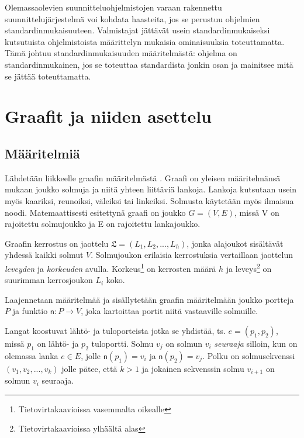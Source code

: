 \documentclass[finnish,12pt]{article}
\begin{document}
Olemassaolevien suunnitteluohjelmistojen varaan rakennettu suunnittelujärjestelmä voi kohdata haasteita, jos se perustuu ohjelmien standardinmukaisuuteen.
Valmistajat jättävät usein standardinmukaiseksi kutsutuista ohjelmistoista määrittelyn mukaisia ominaisuuksia toteuttamatta.\cite{RefWorks:42}
Tämä johtuu standardinmukaisuuden määritelmästä: ohjelma on standardinmukainen, jos se toteuttaa standardista jonkin osan ja mainitsee mitä se jättää toteuttamatta. 

	\clearpage

	
	\section{Graafit ja niiden asettelu}

	\subsection{Määritelmiä}

Lähdetään liikkeelle graafin määritelmästä \cite{RefWorks:39}.
Graafi on yleisen määritelmänsä mukaan joukko solmuja ja niitä yhteen liittäviä lankoja.
Lankoja kutsutaan usein myös kaariksi, reunoiksi, väleiksi tai linkeiksi. Solmusta käytetään myös ilmaisua noodi.
Matemaattisesti esitettynä graafi on joukko $G = (V, E)$, missä V on rajoitettu solmujoukko ja E on rajoitettu lankajoukko.

Graafin kerrostus on jaottelu $\mathfrak{L} = (L_1, L_2, ..., L_h)$, jonka alajoukot sisältävät yhdessä kaikki solmut $V$.
Solmujoukon erilaisia kerrostuksia vertaillaan jaottelun \emph{leveyden} ja \emph{korkeuden} avulla.
Korkeus\footnote{Tietovirtakaavioissa vasemmalta oikealle} on kerrosten määrä $h$ ja leveys\footnote{Tietovirtakaavioissa ylhäältä alas} on suurimman kerrosjoukon $L_i$ koko.

Laajennetaan määritelmää ja sisällytetään graafin määritelmään joukko portteja $P$ ja funktio $\mathsf{n} : P \rightarrow V$, joka kartoittaa portit niitä vastaaville solmuille.

Langat koostuvat lähtö- ja tuloporteista jotka se yhdistää, ts. $e = (p_1, p_2)$, missä $p_1$ on lähtö- ja $p_2$ tuloportti.
Solmu $v_j$ on solmun $v_i$ \emph{seuraaja} silloin, kun on olemassa lanka $e \in E$, jolle $\mathsf{n}(p_1) = v_i$ ja $\mathsf{n}(p_2) = v_j$.
Polku on solmusekvenssi $(v_1, v_2, ..., v_k)$ jolle pätee, että $k>1$ ja jokainen sekvenssin solmu $v_{i+1}$ on solmun $v_i$ seuraaja.
\end{document}
